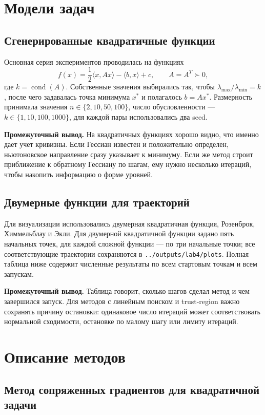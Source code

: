 \documentclass[14pt,a4paper]{extarticle}
\begin{document}
\section{Модели задач}

\subsection{Сгенерированные квадратичные функции}

Основная серия экспериментов проводилась на функциях
\[
    f(x)=\frac{1}{2}\langle x,Ax\rangle-\langle b,x\rangle+c,\qquad A=A^T\succ0,
\]
где $k=\operatorname{cond}(A)$. Собственные значения выбирались так, чтобы $\lambda_{\max}/\lambda_{\min}=k$, после чего задавалась точка минимума $x^*$ и полагалось $b=Ax^*$. Размерность принимала значения $n\in\{2,10,50,100\}$, число обусловленности --- $k\in\{1,10,100,1000\}$, для каждой пары использовались два seed.

\textbf{Промежуточный вывод.} На квадратичных функциях хорошо видно, что именно дает учет кривизны. Если Гессиан известен и положительно определен, ньютоновское направление сразу указывает к минимуму. Если же метод строит приближение к обратному Гессиану по шагам, ему нужно несколько итераций, чтобы накопить информацию о форме уровней.

\subsection{Двумерные функции для траекторий}

Для визуализации использовались двумерная квадратичная функция, Розенброк, Химмельблау и Экли. Для двумерной квадратичной функции задано пять начальных точек, для каждой сложной функции --- по три начальные точки; все соответствующие траектории сохраняются в \texttt{../outputs/lab4/plots}. Полная таблица ниже содержит численные результаты по всем стартовым точкам и всем запускам.

\textbf{Промежуточный вывод.} Таблица говорит, сколько шагов сделал метод и чем завершился запуск. Для методов с линейным поиском и trust-region важно сохранять причину остановки: одинаковое число итераций может соответствовать нормальной сходимости, остановке по малому шагу или лимиту итераций.

\section{Описание методов}

\subsection{Метод сопряженных градиентов для квадратичной задачи}
\end{document}
